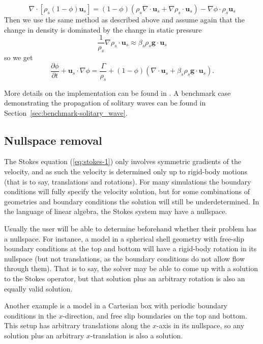 \documentclass{article}
\begin{document}
\begin{equation*}
\nabla \cdot \left[ \rho_s (1 - \phi) \mathbf{u}_s \right]
= \left( 1-\phi \right) \left( \rho_s \nabla \cdot \mathbf{u}_s
+ \nabla \rho_s \cdot \mathbf{u}_s \right)
- \nabla \phi \cdot \rho_s \mathbf{u}_s
\end{equation*}
Then we use the same method as described above and assume again that the change in density is dominated by the change in static pressure
\begin{equation*}
\frac{1}{\rho_s} \nabla \rho_s \cdot \mathbf{u}_s
\approx \beta_s \rho_s \textbf{g} \cdot \mathbf{u}_s
\end{equation*}
so we get
\begin{equation*}
\frac{\partial \phi}{\partial t} + \mathbf{u}_s \cdot \nabla \phi
= \frac{\Gamma}{\rho_s}
+ (1 - \phi) (\nabla \cdot \mathbf{u}_s + \beta_s \rho_s \textbf{g} \cdot \mathbf{u}_s ).
\end{equation*}

More details on the implementation can be found in \cite{dannberg_melt}. A benchmark case demonstrating the propagation of solitary waves can be found in Section~\ref{sec:benchmark-solitary_wave}.

\subsection{Nullspace removal}

The Stokes equation (\ref{eq:stokes-1}) only involves symmetric gradients of the velocity, and as such
the velocity is determined only up to rigid-body motions (that is to say, translations and rotations).
For many simulations the boundary conditions will fully specify the velocity solution, but for some
combinations of geometries and boundary conditions the solution will still be underdetermined.
In the language of linear algebra, the Stokes system may have a nullspace.

Usually the user will be able to determine beforehand whether their problem has a nullspace.  For instance,
a model in a spherical shell geometry with free-slip boundary conditions at the top and bottom will
have a rigid-body rotation in its nullspace (but not translations, as the boundary conditions do not
allow flow through them).  That is to say, the solver may be able to come up with a solution to
the Stokes operator, but that solution plus an arbitrary rotation is also an equally valid solution.

Another example is a model in a Cartesian box with periodic boundary conditions in the $x$-direction,
and free slip boundaries on the top and bottom. This setup has arbitrary translations along the $x$-axis
in its nullspace, so any solution plus an arbitrary $x$-translation is also a solution.
\end{document}
